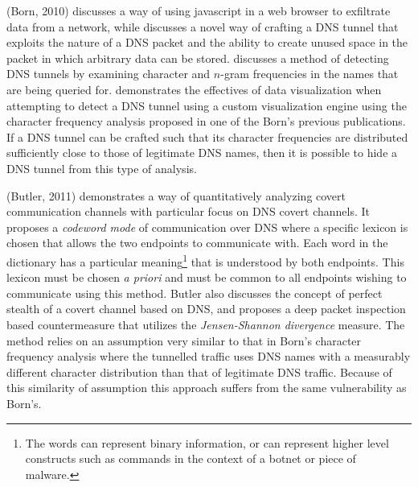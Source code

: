\documentclass[12pt]{report}
\theoremstyle{remark}
\theoremstyle{definition}
\theoremstyle{definition}
\theoremstyle{definition}
\begin{document}
(Born, 2010)\cite{Born2010.exfil} discusses a way of using javascript in a web
browser to exfiltrate data from a network, while \cite{Born2010.psudp} discusses
a novel way of crafting a DNS tunnel that exploits the nature of a DNS packet
and the ability to create unused space in the packet in which arbitrary data can
be stored. \cite{Born2010.cfa} discusses a method of detecting DNS tunnels by
examining character and $n$-gram frequencies in the names that are being queried
for. \cite{Born2010.ngviz} demonstrates the effectives of data visualization
when attempting to detect a DNS tunnel using a custom visualization engine using
the character frequency analysis proposed in one of the Born's previous
publications. If a DNS tunnel can be crafted such that its character frequencies
are distributed sufficiently close to those of legitimate DNS names, then it is
possible to hide a DNS tunnel from this type of analysis.

(Butler, 2011)\cite{Butler2011} demonstrates a way of quantitatively analyzing
covert communication channels with particular focus on DNS covert channels. It
proposes a \emph{codeword mode} of communication over DNS where a specific
lexicon is chosen that allows the two endpoints to communicate with. Each word
in the dictionary has a particular meaning\footnote{The words can represent
binary information, or can represent higher level constructs such as commands in
the context of a botnet or piece of malware.} that is understood by both
endpoints. This lexicon must be chosen \emph{a priori} and must be common to all
endpoints wishing to communicate using this method. Butler also discusses the
concept of perfect stealth of a covert channel based on DNS, and proposes a deep
packet inspection based countermeasure that utilizes the \emph{Jensen-Shannon
divergence} measure. The method relies on an assumption very similar to that in
Born's character frequency analysis where the tunnelled traffic uses DNS names
with a measurably different character distribution than that of legitimate DNS
traffic. Because of this similarity of assumption this approach suffers from the
same vulnerability as Born's.
\end{document}
